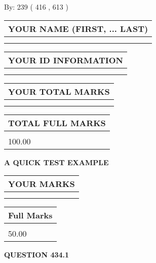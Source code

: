 \documentclass[12pt]{article}
\begin{document}
   
\hspace{1.0in} By: 
 239 ( 416 ,  613 )
   
   
   
   
\newpage 
\setcounter{page}{ 
   434001 } 
   
   
   
   
\noindent\begin{tabular}{|l|}
\hline
YOUR NAME (FIRST, ... LAST)  \\
\hline
 \\ 
 \\ 
\hline
\end{tabular}
\hspace{0.05in} \begin{tabular}{|l|}
\hline
 YOUR   ID   INFORMATION  \\
\hline
 \\ 
 \\ 
\hline
\end{tabular}
   
   
\vspace{0.2in}\noindent\begin{tabular}{|l|}
\hline
YOUR TOTAL MARKS  \\
\hline
 \\ 
 \\ 
\hline
\end{tabular}
\hspace{0.05in} \begin{tabular}{|l|}
\hline
TOTAL FULL MARKS  \\
\hline
 \\ 
100.00 \\
\hline
\end{tabular}
   
   
 \vspace{0.2in}
{\LARGE {\textbf{ A QUICK TEST EXAMPLE}}}
   
   
  
\vspace{0.2in}
  
\noindent\begin{tabular}{|l|}
\hline
 YOUR MARKS  \\
\hline
 \\ 
 \\ 
\hline
\end{tabular}
\hspace{0.05in} \begin{tabular}{|l|}
\hline
 Full Marks  \\
\hline
 \\ 
50.00 \\
\hline
\end{tabular}
{\textbf{\Large{QUESTION
434.1 
}}}
  
\end{document}
